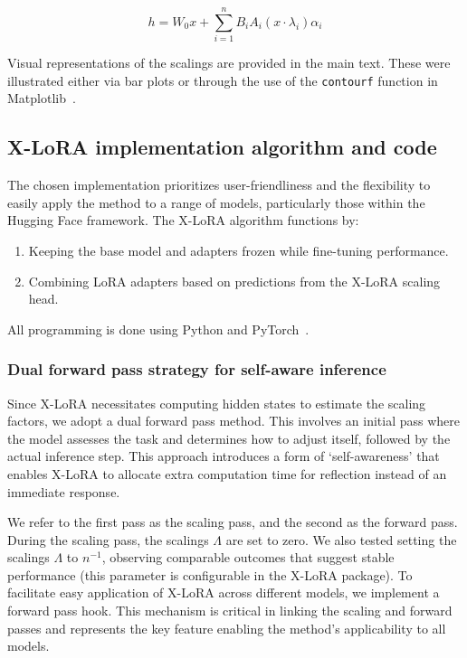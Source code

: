 \begin{equation}
    h = W_0x + \sum_{i=1}^{n} B_iA_i(x \cdot  \lambda_i) \alpha_i
\end{equation}

Visual representations of the scalings are provided in the main text. These were illustrated either via bar plots or through the use of the \texttt{contourf} function in Matplotlib~\cite{MatplotlibDocumentation}.

\subsection{X-LoRA implementation algorithm and code} The chosen implementation prioritizes user-friendliness and the flexibility to easily apply the method to a range of models, particularly those within the Hugging Face framework. The X-LoRA algorithm functions by:

\begin{enumerate}
    \item Keeping the base model and adapters frozen while fine-tuning performance.
    \item Combining LoRA adapters based on predictions from the X-LoRA scaling head.
\end{enumerate}

All programming is done using Python and PyTorch~\cite{Paszke2019PyTorchLibrary}. 

\subsubsection{Dual forward pass strategy for self-aware inference} Since X-LoRA necessitates computing hidden states to estimate the scaling factors, we adopt a dual forward pass method. This involves an initial pass where the model assesses the task and determines how to adjust itself, followed by the actual inference step. This approach introduces a form of `self-awareness' that enables X-LoRA to allocate extra computation time for reflection instead of an immediate response. 

We refer to the first pass as the scaling pass, and the second as the forward pass. During the scaling pass, the scalings $\Lambda$ are set to zero. We also tested setting the scalings $\Lambda$ to ${n}^{-1}$, observing comparable outcomes that suggest stable performance (this parameter is configurable in the X-LoRA package). To facilitate easy application of X-LoRA across different models, we implement a forward pass hook. This mechanism is critical in linking the scaling and forward passes and represents the key feature enabling the method’s applicability to all models.

